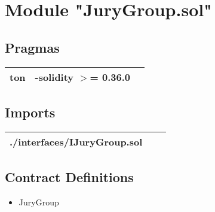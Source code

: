 
\section{Module "JuryGroup.sol"}


\subsection{Pragmas}


\noindent\begin{tabular}{|l|l|p{5cm}|}\hline
ton & -solidity $>$= 0.36.0 &\\\hline
\end{tabular}


\subsection{Imports}


\noindent\begin{tabular}{|l|l|p{5cm}|}\hline
./interfaces/IJuryGroup.sol &\\\hline
\end{tabular}


\subsection{Contract Definitions}

\begin{itemize}
\item JuryGroup
\end{itemize}
